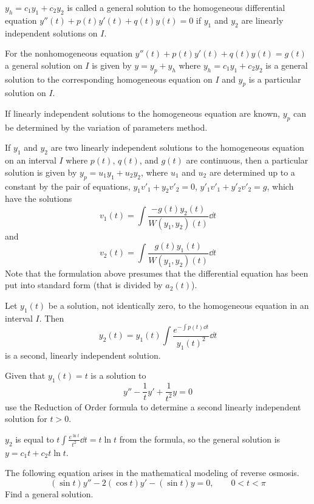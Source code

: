 \documentclass[../diffeq.tex]{subfiles}
\begin{document}
$y_h=c_1y_1+c_2y_2$ is called a general solution to the homogeneous differential equation $y''(t)+p(t)y'(t)+q(t)y(t)=0$ if $y_1$ and $y_2$ are linearly independent solutions on $I$.

For the nonhomogeneous equation $y''(t)+p(t)y'(t)+q(t)y(t)=g(t)$ a general solution on $I$ is given by $y=y_p+y_h$ where $y_h=c_1y_1+c_2y_2$ is a general solution to the corresponding homogeneous equation on $I$ and $y_p$ is a particular solution on $I$.

If linearly independent solutions to the homogeneous equation are known, $y_p$ can be determined by the variation of parameters method.

\begin{theorem}
    If $y_1$ and $y_2$ are two linearly independent solutions to the homogeneous equation on an interval $I$ where $p(t)$, $q(t)$, and $g(t)$ are continuous, then a particular solution is given by $y_p=u_1y_1+u_2y_2$, where $u_1$ and $u_2$ are determined up 
    to a constant by the pair of equations, $y_1v'_1+y_2v'_2=0$, $y'_1v'_1+y'_2v'_2=g$, which have the solutions 
    \[ v_1(t)=\int \frac{-g(t)y_2(t)}{W(y_1,y_2)(t)}\dd t \]
    and 
    \[ v_2(t)=\int \frac{g(t)y_1(t)}{W(y_1,y_2)(t)}\dd t \]
    Note that the formulation above presumes that the differential equation has been put into standard form (that is divided by $a_2(t)$).
\end{theorem}

\begin{theorem}
    Let $y_1(t)$ be a solution, not identically zero, to the homogeneous equation in an interval $I$. Then 
    \[ y_2(t)=y_1(t)\int \frac{e^{-\int p(t) \dd t}}{y_1(t)^2} \dd t \]
    is a second, linearly independent solution.
\end{theorem}

\begin{example}
    Given that $y_1(t)=t$ is a solution to 
    \[ y''-\frac{1}{t}y' + \frac{1}{t^2}y = 0 \]
    use the Reduction of Order formula to determine a second linearly independent solution for $t>0$.

    $y_2$ is equal to $t\int \frac{e^{\ln t}}{t^2} \dd t = t\ln t$ from the formula, so the general solution is $y=c_1t+c_2t\ln t$.
\end{example}

\ex The following equation arises in the mathematical modeling of reverse osmosis. \[ (\sin t)y'' - 2(\cos t)y' - (\sin t)y =0, \qquad 0<t<\pi \] Find a general solution.
\end{document}
